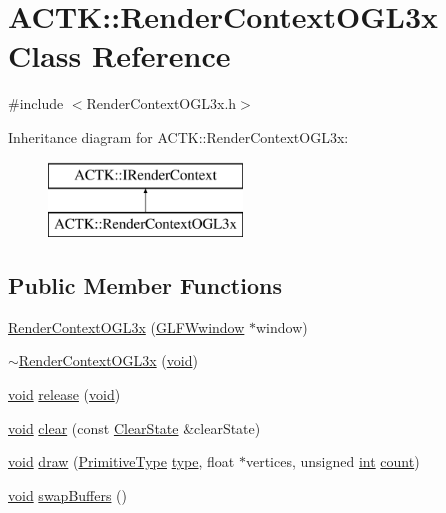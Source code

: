 \hypertarget{class_a_c_t_k_1_1_render_context_o_g_l3x}{\section{A\-C\-T\-K\-:\-:Render\-Context\-O\-G\-L3x Class Reference}
\label{class_a_c_t_k_1_1_render_context_o_g_l3x}
}


{\ttfamily \#include $<$Render\-Context\-O\-G\-L3x.\-h$>$}

Inheritance diagram for A\-C\-T\-K\-:\-:Render\-Context\-O\-G\-L3x\-:\begin{figure}[H]
\begin{center}
\leavevmode
\includegraphics[height=2.000000cm]{class_a_c_t_k_1_1_render_context_o_g_l3x}
\end{center}
\end{figure}
\subsection*{Public Member Functions}
\begin{DoxyCompactItemize}
\item 
\hyperlink{class_a_c_t_k_1_1_render_context_o_g_l3x_a81a52802069f9ba51753921e84d477b7}{Render\-Context\-O\-G\-L3x} (\hyperlink{group__window_ga3c96d80d363e67d13a41b5d1821f3242}{G\-L\-F\-Wwindow} $\ast$window)
\item 
\hyperlink{class_a_c_t_k_1_1_render_context_o_g_l3x_a8114101d26193931a27038624fd0fce7}{$\sim$\-Render\-Context\-O\-G\-L3x} (\hyperlink{wglew_8h_aeea6e3dfae3acf232096f57d2d57f084}{void})
\item 
\hyperlink{wglew_8h_aeea6e3dfae3acf232096f57d2d57f084}{void} \hyperlink{class_a_c_t_k_1_1_render_context_o_g_l3x_a37093e0c176e5d3e2c471c6aeff1e74b}{release} (\hyperlink{wglew_8h_aeea6e3dfae3acf232096f57d2d57f084}{void})
\item 
\hyperlink{wglew_8h_aeea6e3dfae3acf232096f57d2d57f084}{void} \hyperlink{class_a_c_t_k_1_1_render_context_o_g_l3x_a91a1777984fd8cee51e84259b57c0f18}{clear} (const \hyperlink{struct_a_c_t_k_1_1_clear_state}{Clear\-State} \&clear\-State)
\item 
\hyperlink{wglew_8h_aeea6e3dfae3acf232096f57d2d57f084}{void} \hyperlink{class_a_c_t_k_1_1_render_context_o_g_l3x_a002b6e90cae7a9b179b3d408c3e2091b}{draw} (\hyperlink{namespace_a_c_t_k_ac879d5bd28581fddd1c876d2103156b8}{Primitive\-Type} \hyperlink{glew_8h_a8d78e2e8a676abd547a596dd84811285}{type}, float $\ast$vertices, unsigned \hyperlink{wglew_8h_a500a82aecba06f4550f6849b8099ca21}{int} \hyperlink{glew_8h_a10b284d589000663becfbc6867a3a9f7}{count})
\item 
\hyperlink{wglew_8h_aeea6e3dfae3acf232096f57d2d57f084}{void} \hyperlink{class_a_c_t_k_1_1_render_context_o_g_l3x_a8691c3c087f58194a049ac8f50af369f}{swap\-Buffers} ()
\end{DoxyCompactItemize}
